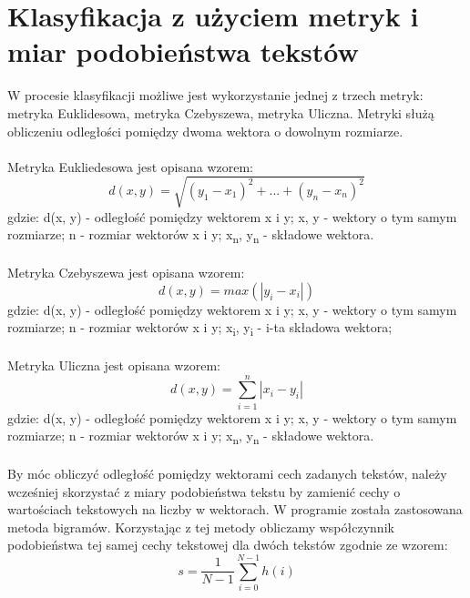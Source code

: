\documentclass{classrep}
\begin{document}
\section{Klasyfikacja z użyciem metryk i miar podobieństwa tekstów}

W procesie klasyfikacji możliwe jest wykorzystanie jednej z trzech metryk: metryka Euklidesowa, metryka Czebyszewa, metryka Uliczna. Metryki służą obliczeniu odległości pomiędzy dwoma wektora o dowolnym rozmiarze.\\\\ Metryka Eukliedesowa\cite{dane} jest opisana wzorem: 
\begin{equation} d(x, y) = \sqrt{(y_1 - x_1)^2 + ... + (y_n - x_n)^2}  \end{equation}
gdzie: d(x, y) - odległość pomiędzy wektorem x i y; x, y - wektory o tym samym rozmiarze; n - rozmiar wektorów x i y;  x\textsubscript{n}, y\textsubscript{n} - składowe wektora. 
\\\\
Metryka Czebyszewa\cite{dane} jest opisana wzorem: 
\begin{equation} d(x, y) = max(|y_i - x_i|) \end{equation}
gdzie: d(x, y) - odległość pomiędzy wektorem x i y; x, y - wektory o tym samym rozmiarze; n - rozmiar wektorów x i y;  x\textsubscript{i}, y\textsubscript{i} - i-ta składowa wektora;
\\\\
Metryka Uliczna\cite{dane} jest opisana wzorem: 
\begin{equation} d(x, y) = \sum_{i = 1}^{n} |x_i - y_i| \end{equation}
gdzie: d(x, y) - odległość pomiędzy wektorem x i y; x, y - wektory o tym samym rozmiarze; n - rozmiar wektorów x i y;  x\textsubscript{n}, y\textsubscript{n} - składowe wektora. 
\\\\
By móc obliczyć odległość pomiędzy wektorami cech zadanych tekstów, należy wcześniej skorzystać z miary podobieństwa tekstu by zamienić cechy o wartościach tekstowych na liczby w wektorach. W programie została zastosowana metoda bigramów\cite{wyklad}. Korzystając z tej metody obliczamy współczynnik podobieństwa tej samej cechy tekstowej dla dwóch tekstów zgodnie ze wzorem:
\begin{equation} s = \frac {1}{N - 1}  \sum_{i = 0}^{N-1}h(i) \end{equation}
\end{document}
